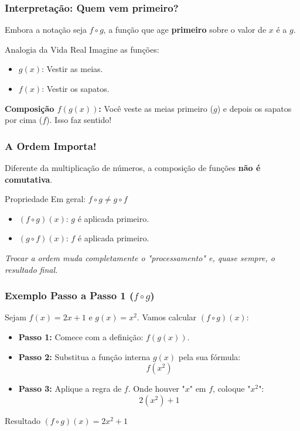 \documentclass[9pt]{beamer}
\begin{document}
\begin{frame}
\frametitle{Interpretação: Quem vem primeiro?}
Embora a notação seja $f \circ g$, a função que age \textbf{primeiro} sobre o valor de $x$ é a $g$.

\begin{exampleblock}{Analogia da Vida Real}
Imagine as funções:
\begin{itemize}
    \item $g(x)$: Vestir as meias.
    \item $f(x)$: Vestir os sapatos.
\end{itemize}
\textbf{Composição $f(g(x))$:} Você veste as meias primeiro ($g$) e depois os sapatos por cima ($f$). Isso faz sentido!
\end{exampleblock}
\end{frame}

\begin{frame}
\frametitle{A Ordem Importa!}
Diferente da multiplicação de números, a composição de funções \textbf{não é comutativa}.

\begin{alertblock}{Propriedade}
Em geral: \Large \centering $f \circ g \neq g \circ f$
\end{alertblock}

\begin{itemize}
    \item $(f \circ g)(x)$: $g$ é aplicada primeiro.
    \item $(g \circ f)(x)$: $f$ é aplicada primeiro.
\end{itemize}

\textit{Trocar a ordem muda completamente o "processamento" e, quase sempre, o resultado final.}
\end{frame}

\begin{frame}
\frametitle{Exemplo Passo a Passo 1 ($f \circ g$)}
Sejam $f(x) = 2x + 1$ e $g(x) = x^2$. Vamos calcular $(f \circ g)(x)$:

\begin{itemize}
    \item \textbf{Passo 1:} Comece com a definição: $f(g(x))$.
    \item \textbf{Passo 2:} Substitua a função interna $g(x)$ pela sua fórmula:
    \[ f(x^2) \]
    \item \textbf{Passo 3:} Aplique a regra de $f$. Onde houver "$x$" em $f$, coloque "$x^2$":
    \[ 2(x^2) + 1 \]
\end{itemize}

\begin{block}{Resultado}
$(f \circ g)(x) = 2x^2 + 1$
\end{block}
\end{frame}
\end{document}

